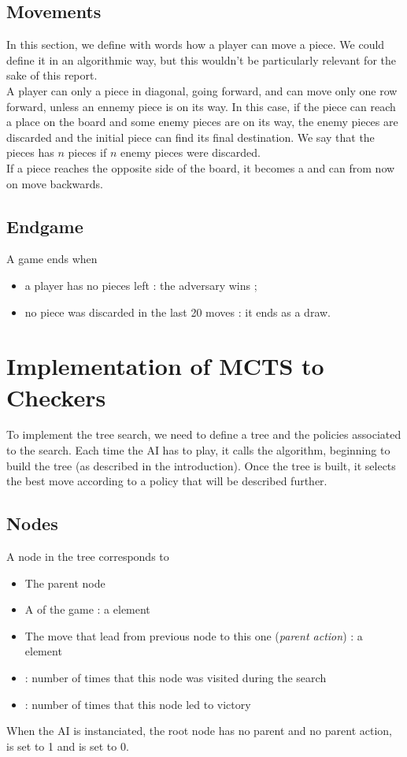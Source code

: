 \documentclass[11pt,a4paper]{article}
\begin{document}
\subsection{Movements}
In this section, we define with words how a player can move a piece. We could define it in an algorithmic way, but this wouldn't be particularly relevant for the sake of this report. \\

A player can only  a piece in diagonal, going forward, and can move only one row forward, unless an ennemy piece is on its way. In this case, if the piece can reach a place on the board and some enemy pieces are on its way, the enemy pieces are discarded and the initial piece can find its final destination. We say that the pieces has  $n$ pieces if $n$ enemy pieces were discarded. \\

If a piece reaches the opposite side of the board, it becomes a  and can from now on move backwards.
\subsection{Endgame}
A game ends when 
\begin{itemize}
    \item a player has no pieces left : the adversary wins ;
    \item no piece was discarded in the last 20 moves : it ends as a draw.
\end{itemize}
  

\section{Implementation of MCTS to Checkers}
To implement the tree search, we need to define a tree and the policies associated to the search. Each time the AI has to play, it calls the algorithm, beginning to build the tree (as described in the introduction). Once the tree is built, it selects the best move according to a policy that will be described further.

\subsection{Nodes}
A node in the tree corresponds to 
\begin{itemize}
    \item The parent node
    \item A  of the game : a  element
    \item The move that lead from previous node to this one (\textit{parent action}) : a  element  
    \item {} : number of times that this node was visited during the search
    \item {} : number of times that this node led to victory
\end{itemize}
When the AI is instanciated, the root node has no parent and no parent action,  is set to 1 and  is set to 0.
\end{document}
